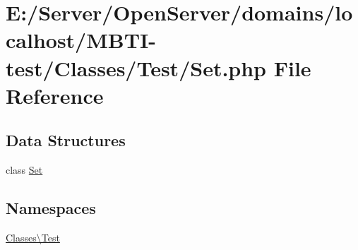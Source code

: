 \hypertarget{_set_8php}{}\section{E\+:/\+Server/\+Open\+Server/domains/localhost/\+M\+B\+T\+I-\/test/\+Classes/\+Test/\+Set.php File Reference}
\label{_set_8php}
\subsection*{Data Structures}
\begin{DoxyCompactItemize}
\item 
class \hyperlink{class_classes_1_1_test_1_1_set}{Set}
\end{DoxyCompactItemize}
\subsection*{Namespaces}
\begin{DoxyCompactItemize}
\item 
 \hyperlink{namespace_classes_1_1_test}{Classes\textbackslash{}\+Test}
\end{DoxyCompactItemize}
